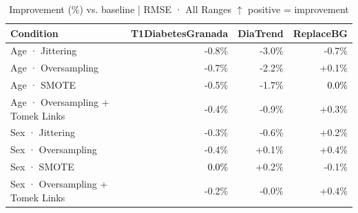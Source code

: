 \begin{table}[htbp]
\centering
\small
\caption{Improvement (\%) vs. baseline  |  RMSE · All Ranges  $\uparrow$ positive = improvement}
\label{tab:delta_rmse_entire_family_size_oversampling}
\begin{tabular}{lrrr}
\toprule
\textbf{Condition} & \textbf{T1DiabetesGranada} & \textbf{DiaTrend} & \textbf{ReplaceBG} \\
\midrule
Age · Jittering & \textcolor{BrickRed}{-0.8\%} & \textcolor{BrickRed}{-3.0\%} & \textcolor{BrickRed}{-0.7\%} \\
Age · Oversampling & \textcolor{BrickRed}{-0.7\%} & \textcolor{BrickRed}{-2.2\%} & \textcolor{OliveGreen}{+0.1\%} \\
Age · SMOTE & \textcolor{BrickRed}{-0.5\%} & \textcolor{BrickRed}{-1.7\%} & \textcolor{black}{0.0\%} \\
Age · Oversampling + Tomek Links & \textcolor{BrickRed}{-0.4\%} & \textcolor{BrickRed}{-0.9\%} & \textcolor{OliveGreen}{+0.3\%} \\
\midrule
Sex · Jittering & \textcolor{BrickRed}{-0.3\%} & \textcolor{BrickRed}{-0.6\%} & \textcolor{OliveGreen}{+0.2\%} \\
Sex · Oversampling & \textcolor{BrickRed}{-0.4\%} & \textcolor{OliveGreen}{+0.1\%} & \textcolor{OliveGreen}{+0.4\%} \\
Sex · SMOTE & \textcolor{black}{0.0\%} & \textcolor{OliveGreen}{+0.2\%} & \textcolor{BrickRed}{-0.1\%} \\
Sex · Oversampling + Tomek Links & \textcolor{BrickRed}{-0.2\%} & \textcolor{BrickRed}{-0.0\%} & \textcolor{OliveGreen}{+0.4\%} \\
\bottomrule
\end{tabular}
\end{table}